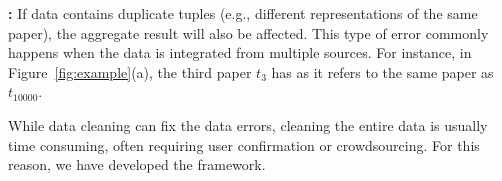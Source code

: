 

\vspace{.5em}

{\noindent \bf \Derror:} If data contains duplicate tuples (e.g., different representations of the same paper), the aggregate result will also be affected. This type of error commonly happens when the data is integrated from multiple sources. For instance, in Figure~\ref{fig:example}(a), the third paper $t_3$ has \derror as it refers to the same paper as $t_{10000}$.  %

\vspace{.5em}







While data cleaning can fix the data errors, cleaning the entire data is usually time consuming, often requiring user confirmation or crowdsourcing. For this reason, we have developed the \saqpplus framework.















